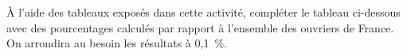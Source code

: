 \documentclass[12pt,a4paper]{article}
\begin{document}
\bigskip
\begin{bilan}
À l'aide des tableaux exposés dans cette activité, compléter le tableau ci-dessous avec des pourcentages calculés par rapport à l'ensemble des ouvriers de France. On arrondira au besoin les résultats à 0,1~\%.

\bigskip
\begin{center}
\renewcommand{\arraystretch}{3}
\end{center}
\end{bilan}
\end{document}

